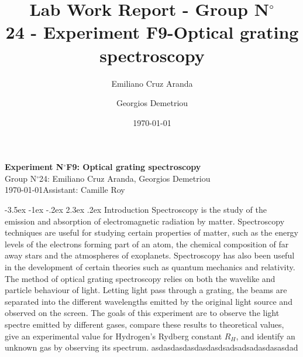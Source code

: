 \documentclass[a4paper, 12pt,oneside]{article}
\makeatletter
\renewcommand{\section}{\@startsection {section}{1}{\z@}%
             {-3.5ex \@plus -1ex \@minus -.2ex}%
             {2.3ex \@plus.2ex}%
             {\normalfont\normalsize\bfseries}}
\makeatother
\begin{document}
\title{\normalsize{Lab Work Report - Group N$^\circ$\\ 24 - Experiment F9-Optical grating spectroscopy}}
\date{\normalsize{\today}}
\author{\normalsize{Emiliano Cruz Aranda}\and \normalsize{Georgios Demetriou}}


\begin{center}
\large\textbf{\sffamily Experiment N$^\circ$F9: Optical grating spectroscopy}\\%
\large\sffamily Group N$^\circ$24: Emiliano Cruz Aranda, Georgios Demetriou\\%
\large\sffamily \today\qquad Assistant: Camille Roy\\%
\end{center}

\section{Introduction}
\vspace{-3mm}
Spectroscopy is the study of the emission and absorption of electromagnetic radiation by matter. Spectroscopy techniques are useful for studying certain properties of matter, such as the energy levels of the electrons forming part of an atom, the chemical composition of far away stars and the atmospheres of exoplanets. Spectroscopy has also been useful in the development of certain theories such as quantum mechanics and relativity\cite{Britannica}. The method of optical grating spectroscopy relies on both the wavelike and particle behaviour of light. Letting light pass through a grating, the beams are separated into the different wavelengths emitted by the original light source and observed on the screen. The goals of this experiment are to observe the light spectre emitted by different gases, compare these results to theoretical values, give an experimental value for Hydrogen's Rydberg constant $R_H$, and identify an unknown gas by observing its spectrum. asdasdasdasdasdasdsadsadsadasdasasdad
\end{document}
